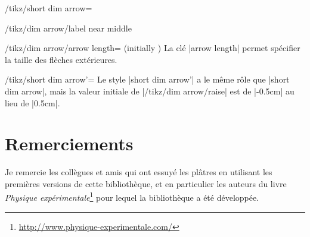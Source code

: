 \documentclass[a4paper]{ltxdoc}
\begin{document}
\begin{stylekey}{/tikz/short dim arrow=}
\begin{key}{/tikz/dim arrow/label near middle}
\begin{codeexample}[]
\end{codeexample}
  \end{key}



  \begin{key}{/tikz/dim arrow/arrow length= (initially )}
  La clé |arrow length| permet spécifier la taille  des flèches extérieures.
  \end{key}
\end{stylekey}

\begin{stylekey}{/tikz/short dim arrow'=}
  Le style |short dim arrow'| a le même rôle que |short dim arrow|, mais la valeur initiale de |/tikz/dim arrow/raise| est de |-0.5cm| au lieu de |0.5cm|.

  \begin{codeexample}[width=4cm]
  \end{codeexample}
\end{stylekey}

\section{Remerciements}

Je remercie les collègues et amis qui ont essuyé les plâtres en utilisant les premières versions de cette bibliothèque, et en particulier les auteurs du livre \emph{Physique expérimentale}\footnote{\url{http://www.physique-experimentale.com/}} pour lequel la bibliothèque a été développée.
\end{document}
